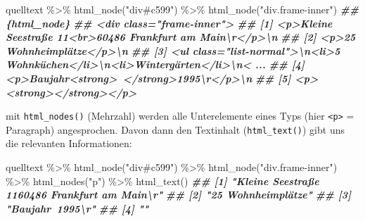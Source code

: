 \documentclass[
  ngerman,
]{article}
\newenvironment{Shaded}{\begin{snugshade}}{\end{snugshade}}
\newcommand{\DocumentationTok}[1]{\textcolor[rgb]{0.56,0.35,0.01}{\textbf{\textit{#1}}}}
\newcommand{\FunctionTok}[1]{\textcolor[rgb]{0.00,0.00,0.00}{#1}}
\newcommand{\NormalTok}[1]{#1}
\newcommand{\SpecialCharTok}[1]{\textcolor[rgb]{0.00,0.00,0.00}{#1}}
\newcommand{\StringTok}[1]{\textcolor[rgb]{0.31,0.60,0.02}{#1}}
\begin{document}
\begin{Shaded}
\begin{Highlighting}[]
\NormalTok{quelltext }\SpecialCharTok{\%\textgreater{}\%}
  \FunctionTok{html\_node}\NormalTok{(}\StringTok{"div\#c599"}\NormalTok{) }\SpecialCharTok{\%\textgreater{}\%}
  \FunctionTok{html\_node}\NormalTok{(}\StringTok{"div.frame{-}inner"}\NormalTok{)}
\DocumentationTok{\#\# \{html\_node\}}
\DocumentationTok{\#\# \textless{}div class="frame{-}inner"\textgreater{}}
\DocumentationTok{\#\# [1] \textless{}p\textgreater{}Kleine Seestraße 11\textless{}br\textgreater{}60486 Frankfurt am Main\textbackslash{}r\textless{}/p\textgreater{}\textbackslash{}n}
\DocumentationTok{\#\# [2] \textless{}p\textgreater{}25 Wohnheimplätze\textless{}/p\textgreater{}\textbackslash{}n}
\DocumentationTok{\#\# [3] \textless{}ul class="list{-}normal"\textgreater{}\textbackslash{}n\textless{}li\textgreater{}5 Wohnküchen\textless{}/li\textgreater{}\textbackslash{}n\textless{}li\textgreater{}Wintergärten\textless{}/li\textgreater{}\textbackslash{}n\textless{} ...}
\DocumentationTok{\#\# [4] \textless{}p\textgreater{}Baujahr\textless{}strong\textgreater{} \textless{}/strong\textgreater{}1995\textbackslash{}r\textless{}/p\textgreater{}\textbackslash{}n}
\DocumentationTok{\#\# [5] \textless{}p\textgreater{}\textless{}strong\textgreater{}\textless{}/strong\textgreater{}\textless{}/p\textgreater{}}
\end{Highlighting}
\end{Shaded}

mit \texttt{html\_nodes()} (Mehrzahl) werden alle Unterelemente eines Typs (hier \texttt{\textless{}p\textgreater{}} = Paragraph) angesprochen. Davon dann den Textinhalt (\texttt{html\_text()}) gibt uns die relevanten Informationen:

\begin{Shaded}
\begin{Highlighting}[]
\NormalTok{quelltext }\SpecialCharTok{\%\textgreater{}\%}
  \FunctionTok{html\_node}\NormalTok{(}\StringTok{"div\#c599"}\NormalTok{) }\SpecialCharTok{\%\textgreater{}\%}
  \FunctionTok{html\_node}\NormalTok{(}\StringTok{"div.frame{-}inner"}\NormalTok{) }\SpecialCharTok{\%\textgreater{}\%}
  \FunctionTok{html\_nodes}\NormalTok{(}\StringTok{"p"}\NormalTok{) }\SpecialCharTok{\%\textgreater{}\%}
  \FunctionTok{html\_text}\NormalTok{()}
\DocumentationTok{\#\# [1] "Kleine Seestraße 1160486 Frankfurt am Main\textbackslash{}r"}
\DocumentationTok{\#\# [2] "25 Wohnheimplätze"                           }
\DocumentationTok{\#\# [3] "Baujahr 1995\textbackslash{}r"                              }
\DocumentationTok{\#\# [4] ""}
\end{Highlighting}
\end{Shaded}
\end{document}
